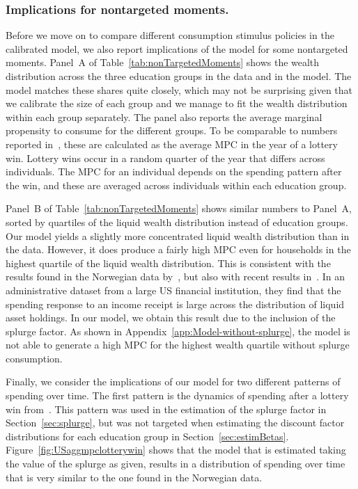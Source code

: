 \documentclass[\latexroot/\projectname]{subfiles}
\begin{document}
\subsubsection{Implications for nontargeted moments.}\whenintegrated{\label{nontargeted-moments}}
\whenintegrated{\label{sec:nonTargetedMoments}}

Before we move on to compare different consumption stimulus policies in the calibrated model, we also report implications of the model for some nontargeted moments.
Panel~A of Table~\ref{tab:nonTargetedMoments} shows the wealth distribution across the three education groups in the data and in the model.
The model matches these shares quite closely, which may not be surprising given that we calibrate the size of each group and we manage to fit the wealth distribution within each group separately.
The panel also reports the average marginal propensity to consume for the different groups.
To be comparable to numbers reported in~\cite{fagereng-mpc-2021}, these are calculated as the average MPC in the year of a lottery win.
Lottery wins occur in a random quarter of the year that differs across individuals.
The MPC for an individual depends on the spending pattern after the win, and these are averaged across individuals within each education group.

Panel~B of Table~\ref{tab:nonTargetedMoments} shows similar numbers to Panel~A, sorted by quartiles of the liquid wealth distribution instead of education groups.
Our model yields a slightly more concentrated liquid wealth distribution than in the data.
However, it does produce a fairly high MPC even for households in the highest quartile of the liquid wealth distribution.
This is consistent with the results found in the Norwegian data by~\cite{fagereng-mpc-2021}, but also with recent results in~\cite{graham2026mental}.
In an administrative dataset from a large US financial institution, they find that the spending response to an income receipt is large across the distribution of liquid asset holdings.
In our model, we obtain this result due to the inclusion of the splurge factor.
As shown in Appendix~\ref{app:Model-without-splurge}, the model is not able to generate a high MPC for the highest wealth quartile without splurge consumption.


Finally, we consider the implications of our model for two different patterns of spending over time.
The first pattern is the dynamics of spending after a lottery win from~\citeauthor{fagereng-mpc-2021}.
This pattern was used in the estimation of the splurge factor in Section~\ref{sec:splurge}, but was not targeted when estimating the discount factor distributions for each education group in Section~\ref{sec:estimBetas}.
Figure~\ref{fig:USaggmpclotterywin} shows that the model that is estimated taking the value of the splurge as given, results in a distribution of spending over time that is very similar to the one found in the Norwegian data.
\end{document}

